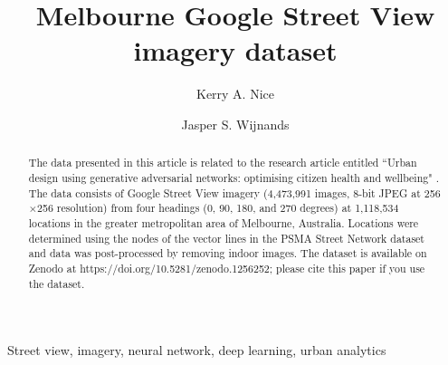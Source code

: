 \documentclass[final,3p,times,authoryear]{elsarticle}
\begin{document}
\begin{frontmatter}



\title{Melbourne Google Street View imagery dataset} 

\author[melb]{Kerry A. Nice}
\author[melb]{Jasper S. Wijnands}
\address[melb]{Transport, Health and Urban Design, Melbourne School of Design, The University of Melbourne, Parkville VIC 3010, Australia}

\begin{abstract}

The data presented in this article is related to the research article entitled ``Urban design using generative adversarial networks: optimising citizen health and wellbeing" \citep{wijnands2018urban}. The data consists of Google Street View imagery (4,473,991 images, 8-bit JPEG at 256$\times$256 resolution) from four headings (0, 90, 180, and 270 degrees) at 1,118,534 locations in the greater metropolitan area of Melbourne, Australia. Locations were determined using the nodes of the vector lines in the PSMA Street Network dataset \citep{PSMA2018} and data was post-processed by removing indoor images. The dataset is available on Zenodo at https://doi.org/10.5281/zenodo.1256252; please cite this paper if you use the dataset.

\end{abstract}

\begin{keyword}
Street view, imagery, neural network, deep learning, urban analytics
\end{keyword}

\end{frontmatter}
\end{document}
